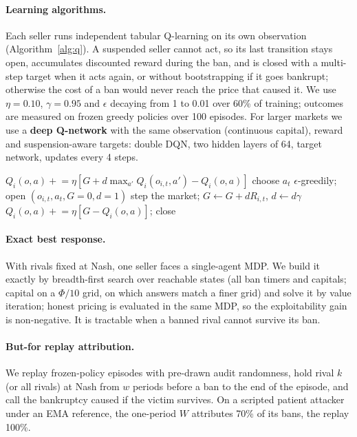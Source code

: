 \documentclass{article}
\begin{document}
\paragraph{Learning algorithms.} Each seller runs independent tabular Q-learning \citep{watkins1992} on its own observation (Algorithm~\ref{alg:q}). A suspended seller cannot act, so its last transition stays open, accumulates discounted reward during the ban, and is closed with a multi-step target when it acts again, or without bootstrapping if it goes bankrupt; otherwise the cost of a ban would never reach the price that caused it. We use $\eta=0.10$, $\gamma=0.95$ and $\epsilon$ decaying from 1 to 0.01 over 60\% of training; outcomes are measured on frozen greedy policies over 100 episodes. For larger markets we use a \textbf{deep Q-network} \citep{mnih2015} with the same observation (continuous capital), reward and suspension-aware targets: double DQN, two hidden layers of 64, target network, updates every 4 steps.

\begin{algorithm}[t]
\caption{Independent Q-learning with suspension-aware transitions (seller $i$)}\label{alg:q}
\small
\begin{algorithmic}[1]
     $Q_i(o,a)\mathrel{+}=\eta[G+d\max_{a'}Q_i(o_{i,t},a')-Q_i(o,a)]$ \EndIf
    \State choose $a_t$ $\epsilon$-greedily; open $(o_{i,t},a_t,G{=}0,d{=}1)$
  \EndIf
  \State step the market; $G\gets G+dR_{i,t}$, $d\gets d\gamma$
   $Q_i(o,a)\mathrel{+}=\eta[G-Q_i(o,a)]$; close \EndIf
\EndFor
\end{algorithmic}
\end{algorithm}

\paragraph{Exact best response.} With rivals fixed at Nash, one seller faces a single-agent MDP. We build it exactly by breadth-first search over reachable states (all ban timers and capitals; capital on a $\Phi/10$ grid, on which answers match a finer grid) and solve it by value iteration; honest pricing is evaluated in the same MDP, so the exploitability gain is non-negative. It is tractable when a banned rival cannot survive its ban.

\paragraph{But-for replay attribution.} We replay frozen-policy episodes with pre-drawn audit randomness, hold rival $k$ (or all rivals) at Nash from $w$ periods before a ban to the end of the episode, and call the bankruptcy caused if the victim survives. On a scripted patient attacker under an EMA reference, the one-period $W$ attributes 70\% of its bans, the replay 100\%.
\end{document}
